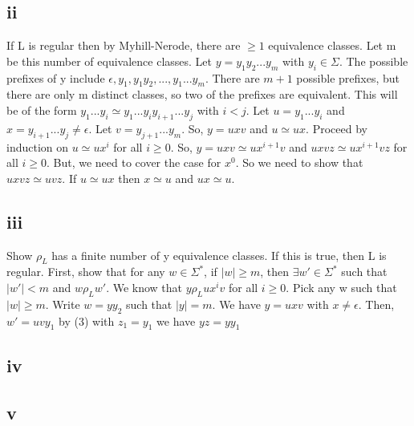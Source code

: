 \documentclass[12pt]{article}
\begin{document}
\subsection*{ii}
If L is regular then by Myhill-Nerode, there are $\ge 1$ equivalence classes. Let m be this number of equivalence classes. Let $y=y_1y_2...y_m$ with $y_i \in \Sigma$. The possible prefixes of y include $\epsilon ,y_1,y_1y_2,...,y_1...y_m$. There are $m+1$ possible prefixes, but there are only m distinct classes, so two of the prefixes are equivalent. This will be of the form $y_1...y_i \simeq y_1...y_iy_{i+1}...y_j$ with $i < j$. Let $u=y_1...y_i$ and $x=y_{i+1}...y_j \neq \epsilon$. Let $v=y_{j+1}...y_m$. So, $y=uxv$ and $u \simeq ux$. Proceed by induction on $u \simeq ux^i$ for all $i \ge 0$. So, $y=uxv \simeq ux^{i+1}v$ and $uxvz \simeq ux^{i+1}vz$ for all $i \ge 0$. But, we need to cover the case for $x^0$. So we need to show that $uxvz \simeq uvz$. If $u \simeq ux$ then $x \simeq u$ and $ux \simeq u$. 

\subsection*{iii}
Show $\rho_L$ has a finite number of y equivalence classes. If this is true, then L is regular. First, show that for any $w \in \Sigma^*$, if $|w| \ge m$, then $\exists w' \in \Sigma^*$ such that $|w'| < m$ and $w \rho_L w'$. We know that $y \rho_L ux^iv$ for all $i \ge 0$. Pick any w such that $|w| \ge m$. Write $w=yy_2$ such that $|y|=m$. We have $y=uxv$ with $x \neq \epsilon$. Then, $w'=uvy_1$ by (3) with $z_1=y_1$ we have $yz=yy_1$  

\subsection*{iv}
\subsection*{v}
\end{document}
